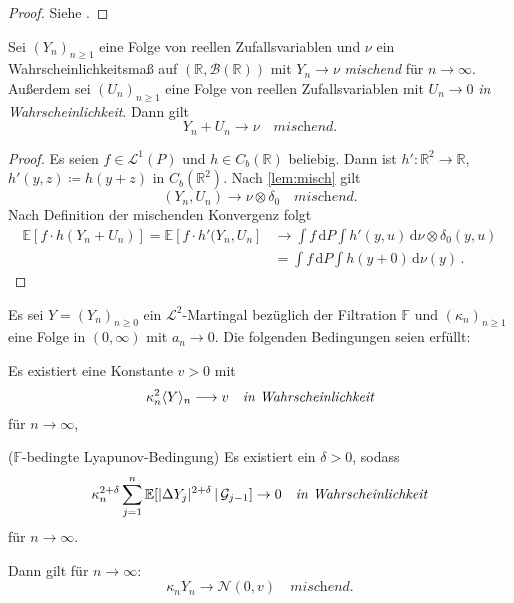 \documentclass[ngerman,a4paper,11pt]{scrartcl}
\newcommand{\EE}{\mathbb{E}}
\newcommand{\FF}{\mathbb{F}}
\newcommand{\RR}{\mathbb{R}}
\newcommand{\bb}{\mathcal{B}}
\renewcommand{\gg}{\mathcal{G}}
\renewcommand{\ll}{\mathcal{L}}
\newcommand{\nn}{\mathcal{N}}
\newcommand{\Cb}[1]{C_b(#1)}
\newcommand{\expect}[1]{\EE[#1]}
\newcommand{\condexp}[2]{\EE[#1\,|\,#2]}
\newcommand{\dvar}[1]{\,\mathrm{d}#1}
\DeclarePairedDelimiter{\sprod}{\langle}{\rangle}	%
\DeclarePairedDelimiter{\abs}{\lvert}{\rvert}		%
\begin{document}
\begin{proof}
 Siehe \cite[Korollar~5.29(a)]{lpw}.
\end{proof}
\begin{cor}\label{cor:mischsum}
  Sei $(Y_n)_{n\geq 1}$ eine Folge von reellen Zufallsvariablen und $\nu$ ein
  Wahrscheinlichkeitsmaß auf $(\RR,\bb(\RR))$ mit $Y_n\to\nu$ \textit{mischend}
  für $n\to\infty$. Außerdem sei $(U_n)_{n\geq 1}$ eine Folge von reellen
  Zufallsvariablen mit $U_n\to 0$ \textit{in Wahrscheinlichkeit}. Dann gilt
\begin{equation*}
 Y_n + U_n\to\nu\quad\textit{mischend.}
\end{equation*}
\end{cor}
\begin{proof}
  Es seien $f\in\ll^1(P)$ und $h\in\Cb{\RR}$ beliebig. Dann ist
  $h':\RR^2\to\RR$, $h'(y,z)\coloneqq h(y+z)$ in $\Cb{\RR^2}$. Nach
  \cref{lem:misch} gilt
\begin{equation*}
 (Y_n,U_n)\to\nu\otimes\delta_0\quad\textit{mischend.}
\end{equation*}
Nach Definition der mischenden Konvergenz folgt
\begin{align*}
  \expect{f\cdot h(Y_n+U_n)}=\expect{f\cdot h'(Y_n,U_n}&\to\int f\dvar{P}\int h'(y,u) \dvar{\nu\otimes\delta_0(y,u)}\\
&=\int f\dvar{P}\int h(y+0) \dvar{\nu(y)}\,.
\end{align*}
\end{proof}
\begin{thm}\label{thm:clt}
  Es sei $Y=(Y_n)_{n\geq 0}$ ein $\ll^2$-Martingal bezüglich der Filtration
  $\FF$ und $(\kappa_n)_{n\geq 1}$ eine Folge in $(0,\infty)$ mit $a_n\to 0$. Die
  folgenden Bedingungen seien erfüllt:
 \begin{thmasslist}
 \item Es existiert eine Konstante $v>0$ mit \label{clt:vora}
   \begin{equation*}
     \kappa_n^2\sprod{Y}_n\longrightarrow v\quad\textit{in Wahrscheinlichkeit}
   \end{equation*}
   für $n\to\infty$,
 \item ($\FF$-bedingte Lyapunov-Bedingung) Es existiert ein $\delta >0$, sodass \label{clt:vorb}
   \begin{equation*}
    \kappa_n^{2+\delta} \sum_{j=1}^n\condexp{\abs{\Delta Y_j}^{2+\delta}}{\gg_{j-1}}\to 0\quad\textit{in Wahrscheinlichkeit}
   \end{equation*}
für ${n\to\infty}$.
 \end{thmasslist}
Dann gilt für ${n\to\infty}$:
\begin{equation*}
 \kappa_nY_n\to\nn(0,v)\quad\textit{mischend.} 
\end{equation*}
\end{thm}
\end{document}
